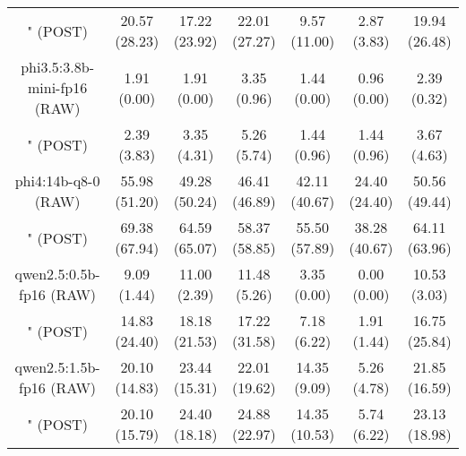 \begin{table}[]
{\begin{tabular}{ccccccc}
        

        \multicolumn{1}{c|}{" (POST)} & 20.57 (28.23) & 17.22 (23.92) & \multicolumn{1}{c|}{22.01 (27.27)} & 9.57 (11.00) & \multicolumn{1}{c|}{2.87 (3.83)} & 19.94 (26.48) \\
        \cline{1-7}
        

        \multicolumn{1}{c|}{phi3.5:3.8b-mini-fp16 (RAW)} & 1.91 (0.00) & 1.91 (0.00) & \multicolumn{1}{c|}{3.35 (0.96)} & 1.44 (0.00) & \multicolumn{1}{c|}{0.96 (0.00)} & 2.39 (0.32) \\
        
        

        \multicolumn{1}{c|}{" (POST)} & 2.39 (3.83) & 3.35 (4.31) & \multicolumn{1}{c|}{5.26 (5.74)} & 1.44 (0.96) & \multicolumn{1}{c|}{1.44 (0.96)} & 3.67 (4.63) \\
        \cline{1-7}
        

        \multicolumn{1}{c|}{phi4:14b-q8-0 (RAW)} & 55.98 (51.20) & 49.28 (50.24) & \multicolumn{1}{c|}{46.41 (46.89)} & 42.11 (40.67) & \multicolumn{1}{c|}{24.40 (24.40)} & 50.56 (49.44) \\
        
        

        \multicolumn{1}{c|}{" (POST)} & 69.38 (67.94) & 64.59 (65.07) & \multicolumn{1}{c|}{58.37 (58.85)} & 55.50 (57.89) & \multicolumn{1}{c|}{38.28 (40.67)} & 64.11 (63.96) \\
        \cline{1-7}
        

        \multicolumn{1}{c|}{qwen2.5:0.5b-fp16 (RAW)} & 9.09 (1.44) & 11.00 (2.39) & \multicolumn{1}{c|}{11.48 (5.26)} & 3.35 (0.00) & \multicolumn{1}{c|}{0.00 (0.00)} & 10.53 (3.03) \\
        
        

        \multicolumn{1}{c|}{" (POST)} & 14.83 (24.40) & 18.18 (21.53) & \multicolumn{1}{c|}{17.22 (31.58)} & 7.18 (6.22) & \multicolumn{1}{c|}{1.91 (1.44)} & 16.75 (25.84) \\
        \cline{1-7}
        

        \multicolumn{1}{c|}{qwen2.5:1.5b-fp16 (RAW)} & 20.10 (14.83) & 23.44 (15.31) & \multicolumn{1}{c|}{22.01 (19.62)} & 14.35 (9.09) & \multicolumn{1}{c|}{5.26 (4.78)} & 21.85 (16.59) \\
        
        

        \multicolumn{1}{c|}{" (POST)} & 20.10 (15.79) & 24.40 (18.18) & \multicolumn{1}{c|}{24.88 (22.97)} & 14.35 (10.53) & \multicolumn{1}{c|}{5.74 (6.22)} & 23.13 (18.98) \\
        \cline{1-7}
        


\end{tabular}}
\end{table}
